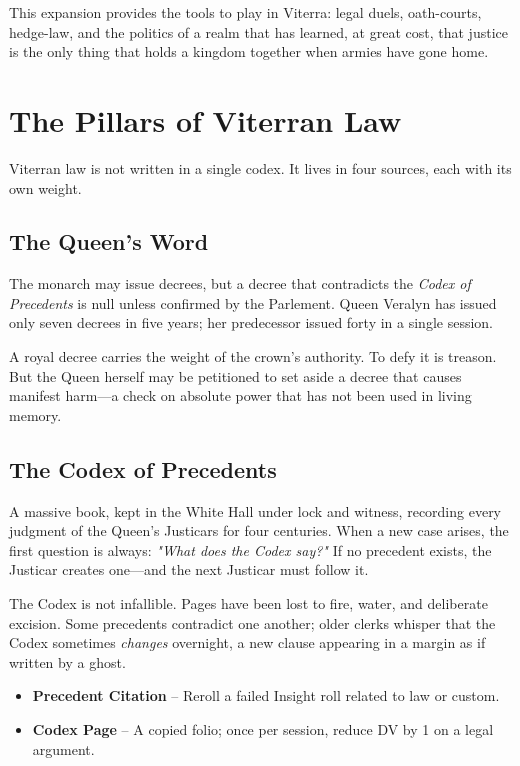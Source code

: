 \documentclass[11pt,twoside]{book}
\newenvironment{sidebar}[1][]
{\begin{tcolorbox}[colback=agedpaper,colframe=royalblue,boxrule=0.5pt,arc=2mm,title={\scshape\small #1},fonttitle=\bfseries]}
{\end{tcolorbox}}
\begin{document}
This expansion provides the tools to play in Viterra: legal duels, oath-courts, hedge-law, and the politics of a realm that has learned, at great cost, that justice is the only thing that holds a kingdom together when armies have gone home.

\chapter{The Pillars of Viterran Law}

Viterran law is not written in a single codex. It lives in four sources, each with its own weight.

\section{The Queen's Word}

The monarch may issue decrees, but a decree that contradicts the \textit{Codex of Precedents} is null unless confirmed by the Parlement. Queen Veralyn has issued only seven decrees in five years; her predecessor issued forty in a single session.

A royal decree carries the weight of the crown's authority. To defy it is treason. But the Queen herself may be petitioned to set aside a decree that causes manifest harm---a check on absolute power that has not been used in living memory.

\section{The Codex of Precedents}

A massive book, kept in the White Hall under lock and witness, recording every judgment of the Queen's Justicars for four centuries. When a new case arises, the first question is always: \textit{"What does the Codex say?"} If no precedent exists, the Justicar creates one---and the next Justicar must follow it.

The Codex is not infallible. Pages have been lost to fire, water, and deliberate excision. Some precedents contradict one another; older clerks whisper that the Codex sometimes \textit{changes} overnight, a new clause appearing in a margin as if written by a ghost.

\begin{sidebar}[Strings (Viterran Law)]
\begin{itemize}
    \item \textbf{Precedent Citation} -- Reroll a failed Insight roll related to law or custom.
    \item \textbf{Codex Page} -- A copied folio; once per session, reduce DV by 1 on a legal argument.
\end{itemize}
\end{sidebar}
\end{document}
